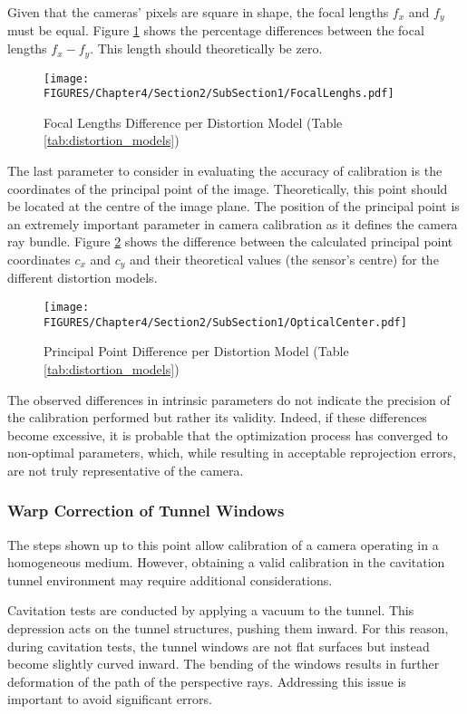 Given that the cameras' pixels are square in shape, the focal lengths $f_x$ and $f_y$ must be equal. Figure \ref{fig:FocalLengths} shows the percentage differences between the focal lengths $f_x - f_y$. This length should theoretically be zero.

\begin{figure}[htbp]
  \centering
  \texttt{[image: FIGURES/Chapter4/Section2/SubSection1/FocalLenghs.pdf]}
  \caption{Focal Lengths Difference per Distortion Model (Table \ref{tab:distortion_models})} 
  \label{fig:FocalLengths}  
\end{figure}

The last parameter to consider in evaluating the accuracy of calibration is the coordinates of the principal point of the image. Theoretically, this point should be located at the centre of the image plane.  
The position of the principal point is an extremely important parameter in camera calibration as it defines the camera ray bundle.  
Figure \ref{fig:OpticalCenter} shows the difference between the calculated principal point coordinates $c_x$ and $c_y$ and their theoretical values (the sensor's centre) for the different distortion models.

\begin{figure}[htbp]
  \centering
  \texttt{[image: FIGURES/Chapter4/Section2/SubSection1/OpticalCenter.pdf]}
  \caption{Principal Point Difference per Distortion Model (Table \ref{tab:distortion_models})} 
  \label{fig:OpticalCenter}  
\end{figure}

The observed differences in intrinsic parameters do not indicate the precision of the calibration performed but rather its validity. Indeed, if these differences become excessive, it is probable that the optimization process has converged to non-optimal parameters, which, while resulting in acceptable reprojection errors, are not truly representative of the camera.

\subsubsection{Warp Correction of Tunnel Windows}
\label{sez:Warp_Correction}

The steps shown up to this point allow calibration of a camera operating in a homogeneous medium. However, obtaining a valid calibration in the cavitation tunnel environment may require additional considerations.

Cavitation tests are conducted by applying a vacuum to the tunnel. This depression acts on the tunnel structures, pushing them inward. For this reason, during cavitation tests, the tunnel windows are not flat surfaces but instead become slightly curved inward. The bending of the windows results in further deformation of the path of the perspective rays. Addressing this issue is important to avoid significant errors.

